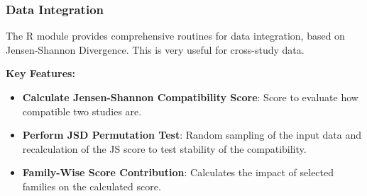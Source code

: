 \subsubsection{Data Integration}
The R module provides comprehensive routines for data integration, based on Jensen-Shannon Divergence. This is very useful for cross-study data.

\textbf{Key Features:}
\begin{itemize}
    \item \textbf{Calculate Jensen-Shannon Compatibility Score}: Score to evaluate how compatible two studies are.
    \item \textbf{Perform JSD Permutation Test}: Random sampling of the input data and recalculation of the JS score to test stability of the compatibility.
    \item \textbf{Family-Wise Score Contribution}: Calculates the impact of selected families on the calculated score.
\end{itemize}

